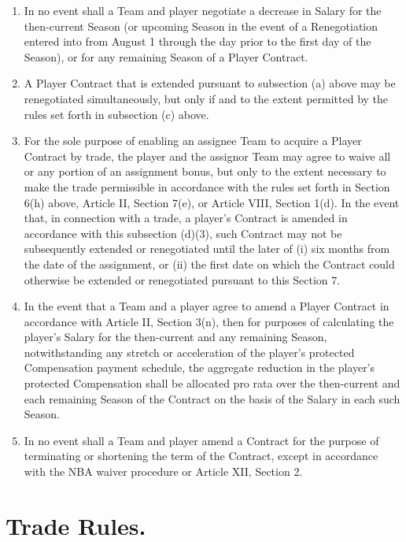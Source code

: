 \documentclass[
]{book}
\providecommand{\tightlist}{%
  \setlength{\itemsep}{0pt}\setlength{\parskip}{0pt}}
\begin{document}
\begin{enumerate}
  \begin{enumerate}
  \def\labelenumii{(\arabic{enumii})}
  \tightlist
  \item
    In no event shall a Team and player negotiate a decrease in Salary for the then-current Season (or upcoming Season in the event of a Renegotiation entered into from August 1 through the day prior to the first day of the Season), or for any remaining Season of a Player Contract.
  \item
    A Player Contract that is extended pursuant to subsection (a) above may be renegotiated simultaneously, but only if and to the extent permitted by the rules set forth in subsection (c) above.
  \item
    For the sole purpose of enabling an assignee Team to acquire a Player Contract by trade, the player and the assignor Team may agree to waive all or any portion of an assignment bonus, but only to the extent necessary to make the trade permissible in accordance with the rules set forth in Section 6(h) above, Article II, Section 7(e), or Article VIII, Section 1(d). In the event that, in connection with a trade, a player's Contract is amended in accordance with this subsection (d)(3), such Contract may not be subsequently extended or renegotiated until the later of (i) six months from the date of the assignment, or (ii) the first date on which the Contract could otherwise be extended or renegotiated pursuant to this Section 7.
  \item
    In the event that a Team and a player agree to amend a Player Contract in accordance with Article II, Section 3(n), then for purposes of calculating the player's Salary for the then-current and any remaining Season, notwithstanding any stretch or acceleration of the player's protected Compensation payment schedule, the aggregate reduction in the player's protected Compensation shall be allocated pro rata over the then-current and each remaining Season of the Contract on the basis of the Salary in each such Season.
  \item
    In no event shall a Team and player amend a Contract for the purpose of terminating or shortening the term of the Contract, except in accordance with the NBA waiver procedure or Article XII, Section 2.
  \end{enumerate}
\end{enumerate}

\hypertarget{trade-rules.}{%
\section{Trade Rules.}\label{trade-rules.}}
\end{document}
